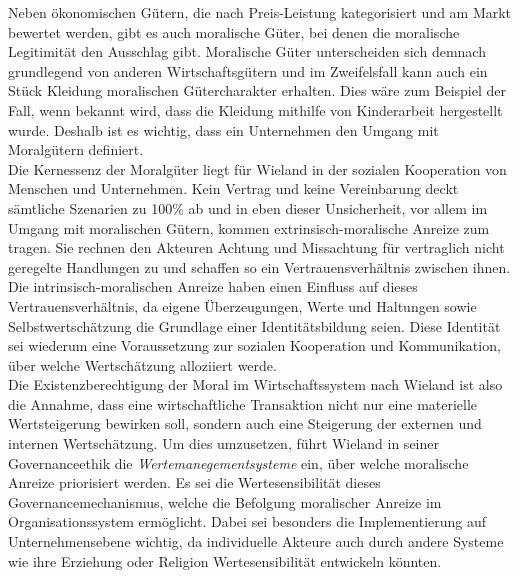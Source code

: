 \documentclass[12pt]{article}
\begin{document}
\FloatBarrier
\noindent Neben ökonomischen Gütern, die nach Preis-Leistung kategorisiert und am Markt bewertet werden, gibt es auch moralische Güter, bei denen die moralische Legitimität den Ausschlag gibt. Moralische Güter unterscheiden sich demnach grundlegend von anderen Wirtschaftsgütern und im Zweifelsfall kann auch ein Stück Kleidung moralischen Gütercharakter erhalten. Dies wäre zum Beispiel der Fall, wenn bekannt wird, dass die Kleidung mithilfe von Kinderarbeit hergestellt wurde. Deshalb ist es wichtig, dass ein Unternehmen den Umgang mit Moralgütern definiert.\\[10pt]
Die Kernessenz der Moralgüter liegt für Wieland in der sozialen Kooperation von Menschen und Unternehmen. Kein Vertrag und keine Vereinbarung deckt sämtliche Szenarien zu 100\% ab und in eben dieser Unsicherheit, vor allem im Umgang mit moralischen Gütern, kommen extrinsisch-moralische Anreize zum tragen. Sie rechnen den Akteuren Achtung und Missachtung für vertraglich nicht geregelte Handlungen zu und schaffen so ein Vertrauensverhältnis zwischen ihnen. Die intrinsisch-moralischen Anreize haben einen Einfluss auf dieses Vertrauensverhältnis, da eigene Überzeugungen, Werte und Haltungen sowie Selbstwertschätzung die Grundlage einer Identitätsbildung seien. Diese Identität sei wiederum eine Voraussetzung zur sozialen Kooperation und Kommunikation, über welche Wertschätzung alloziiert werde.\\[10pt]
Die Existenzberechtigung der Moral im Wirtschaftssystem nach Wieland ist also die Annahme, dass eine wirtschaftliche Transaktion nicht nur eine materielle Wertsteigerung bewirken soll, sondern auch eine Steigerung der externen und internen Wertschätzung. Um dies umzusetzen, führt Wieland in seiner Governanceethik die \textit{Wertemanegementsysteme} ein, über welche moralische Anreize priorisiert werden. Es sei die Wertesensibilität dieses Governancemechanismus, welche die Befolgung moralischer Anreize im Organisationssystem ermöglicht. Dabei sei besonders die Implementierung auf Unternehmensebene wichtig, da individuelle Akteure auch durch andere Systeme wie ihre Erziehung oder Religion Wertesensibilität entwickeln könnten.
\end{document}
